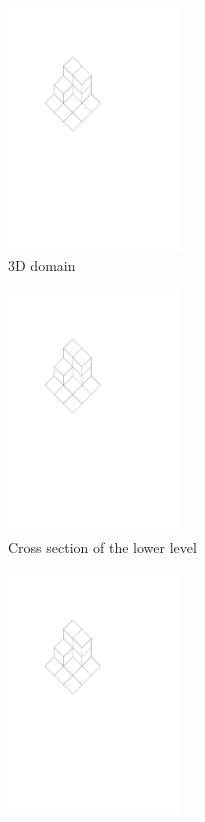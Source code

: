 \documentclass[english,gradu]{tktltiki2018}
\begin{document}
\begin{figure}\centering
	\begin{subfigure}[t]{0.3\textwidth}\centering
		\includegraphics[width=0.5\textwidth,page=1]{fig/split3d}
		\caption{3D domain}
	\end{subfigure}
	\hfil
	\begin{subfigure}[t]{0.3\textwidth}\centering
		\includegraphics[width=0.5\textwidth,page=3]{fig/split3d}
		\caption{Cross section of the lower level}
	\end{subfigure}
	\hfil
	\begin{subfigure}[t]{0.3\textwidth}\centering
		\includegraphics[width=0.5\textwidth,page=4]{fig/split3d}

\end{subfigure}
\end{figure}
\end{document}
